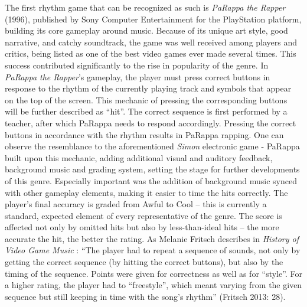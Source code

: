 The first rhythm game that can be recognized as such is \textit{PaRappa the Rapper} (1996), published by Sony Computer Entertainment for the PlayStation platform, building its core gameplay around music. Because of its unique art style, good narrative, and catchy soundtrack, the game was well received among players and critics, being listed as one of the best video games ever made several times. \cite{acclaimed_videogames_parappa} This success contributed significantly to the rise in popularity of the genre. In \textit{PaRappa the Rapper}’s gameplay, the player must press correct buttons in response to the rhythm of the currently playing track and symbols that appear on the top of the screen. This mechanic of pressing the corresponding buttons will be further described as ``hit''. The correct sequence is first performed by a teacher, after which PaRappa needs to respond accordingly. Pressing the correct buttons in accordance with the rhythm results in PaRappa rapping. One can observe the resemblance to the aforementioned \textit{Simon} electronic game - PaRappa built upon this mechanic, adding additional visual and auditory feedback, background music and grading system, setting the stage for further developments of this genre. Especially important was the addition of background music synced with other gameplay elements, making it easier to time the hits correctly. The player’s final accuracy is graded from Awful to Cool -- this is currently a standard, expected element of every representative of the genre. The score is affected not only by omitted hits but also by less-than-ideal hits -- the more accurate the hit, the better the rating. As Melanie Fritsch describes in \textit{History of Video Game Music} \cite{MusicMedien}: ``The player had to repeat a sequence of sounds, not only by getting the correct sequence (by hitting the correct buttons), but also by the timing of the sequence. Points were given for correctness as well as for ``style''. For a higher rating, the player had to ``freestyle'', which meant varying from the given sequence but still keeping in time with the song’s rhythm'' (Fritsch 2013: 28).

